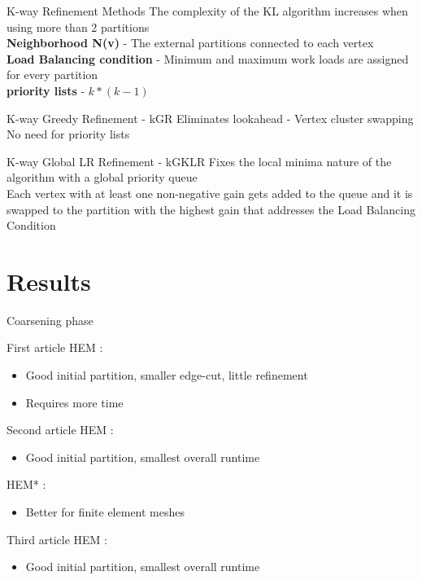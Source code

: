 \documentclass{beamer}
\begin{document}
\begin{frame}{K-way Refinement Methods}
	The complexity of the KL algorithm increases when using more than 2 partitions \\
	\textbf{Neighborhood N(v)} - The external partitions connected to each vertex\\
	\textbf{Load Balancing condition} - Minimum and maximum work loads are assigned for every partition\\
	\textbf{priority lists} - \(k*(k-1)\) 
	\begin{block}{K-way Greedy Refinement - kGR}
		Eliminates lookahead - Vertex cluster swapping\\
		No need for priority lists
	\end{block}
	\begin{block}{K-way Global LR Refinement - kGKLR}
		Fixes the local minima nature of the algorithm with a global priority queue\\
		Each vertex with at least one non-negative gain gets added to the queue and it is swapped to the partition with
		the highest gain that addresses the Load Balancing Condition 
	\end{block}
\end{frame}
\section{Results}

\begin{frame}{Coarsening phase}
	\begin{block}{First article}
		HEM :
		\begin{itemize}
			\item Good initial partition, smaller edge-cut, little refinement
			\item Requires more time
		\end{itemize}
	\end{block}
	\begin{block}{Second article}
		HEM :
		\begin{itemize}
			\item Good initial partition, smallest overall runtime
		\end{itemize}
		HEM* :
		\begin{itemize}
			\item Better for finite element meshes
		\end{itemize}
	\end{block}
	\begin{block}{Third article}
		HEM :
		\begin{itemize}
			\item Good initial partition, smallest overall runtime
		\end{itemize}
	\end{block}
\end{frame}
\end{document}
